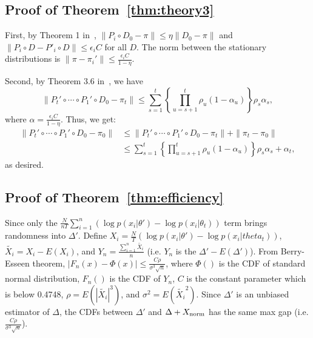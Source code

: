 \documentclass{article}
\begin{document}
\subsection{Proof of Theorem~\ref{thm:theory3}}\label{app:theory3}

First, by Theorem 1 in~\cite{cutting_mh_2014}, $\|P_i \circ D_0 - \pi\| \leq \eta \|D_0
- \pi\|$ and $\|P_i\circ D-P'_i\circ D\| \leq \epsilon_i C$ for all $D$. The norm between the
stationary distributions is $\|\pi - \pi_i'\|\leq \frac{\epsilon_i C}{1-\eta}$.

Second, by Theorem 3.6 in~\cite{yang2013sequential}, we have 
\[
\| P_t' \circ \cdots \circ P_1' \circ D_0 - \pi_t \| \leq \sum_{s=1}^t \left\{\prod _{u=s+1}^t
\rho_u (1-\alpha_u)\right\} \rho_s \alpha_s,
\]
where $\alpha = \frac{\epsilon_i C}{1-\eta}$.  Thus, we get:
\begin{align*}
 \| P_t' \circ \cdots \circ P_1' \circ D_0 - \pi_0 \| &\leq \|P_t' \circ \cdots \circ P_1' \circ D_0 - \pi_t\| + \|\pi_t - \pi_0\| \\
 &\leq \sum_{s=1}^t \left\{\prod _{u=s+1}^t \rho_u (1-\alpha_u)\right\} \rho_s \alpha_s + \alpha_t,
\end{align*}
as desired.

\subsection{Proof of Theorem~\ref{thm:efficiency}}\label{app:theory4}
Since only the $\frac{N}{nT}\sum_{i=1}^n \left(\log p(x_i|\theta') - \log p(x_i|\theta_t) \right)$ term brings randomness into $\Delta'$. Define $X_i = \frac{N}{T}\left(\log p(x_i|\theta') - \log p (x_i|theta_t) \right)$, $\tilde{X_i} = X_i - E(X_i)$, and $Y_n = \frac{\sum_{i=1}^n \tilde{X_i}}{n}$ (i.e. $Y_n$ is the $\Delta' - E(\Delta')$). From Berry-Esseen theorem, $|F_n(x) - \Phi(x)| \leq \frac{C\rho}{\sigma^3\sqrt{n}}$, where $\Phi()$ is the CDF of standard normal distribution, $F_n()$ is the CDF of $Y_n$, $C$ is the constant parameter which is below 0.4748, $\rho = E(|\tilde{X_i}|^3)$, and $\sigma^2 = E(\tilde{X_i}^2)$. Since $\Delta'$ is an unbiased estimator of $\Delta$, the CDFs between $\Delta'$ and $\Delta + X_{\rm norm}$ has the same max gap (i.e. $\frac{C\rho}{\sigma^3\sqrt{n}}$).
\end{document}
